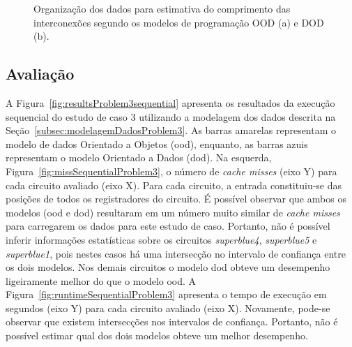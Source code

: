 \begin{figure}[ht]
    \centering
    \hspace{0.1cm}
    \caption[Organização dos dados estudo de caso 3]{Organização dos dados para estimativa do comprimento das interconexões segundo os modelos de programação OOD (a) e DOD (b).}
    \label{fig:problem3ModelagemDados}
\end{figure}


\subsection{Avaliação}

A Figura~\ref{fig:resultsProblem3sequential} apresenta os resultados da execução sequencial do estudo de caso 3 utilizando a modelagem dos dados descrita na Seção~\ref{subsec:modelagemDadosProblem3}. 
As barras amarelas representam o modelo de dados Orientado a Objetos (\ac{ood}), enquanto, as barras azuis representam o modelo Orientado a Dados (\ac{dod}).
Na esquerda, Figura~\ref{fig:missSequentialProblem3}, o número de  \textit{cache misses} (eixo Y) para cada circuito avaliado (eixo X). Para cada circuito, a entrada constituiu-se das posições de todos os registradores do circuito.
É possível observar que ambos os modelos (\ac{ood} e \ac{dod}) resultaram em um número muito similar de \textit{cache misses} para carregarem os dados para este estudo de caso.
Portanto, não é possível inferir informações estatísticas sobre os circuitos \textit{superblue4}, \textit{superblue5} e \textit{superblue1}, pois nestes casos há uma intersecção no intervalo de confiança entre os dois modelos. Nos demais circuitos o modelo \ac{dod} obteve um desempenho ligeiramente melhor do que o modelo \ac{ood}.
A Figura~\ref{fig:runtimeSequentialProblem3} apresenta o tempo de execução em segundos (eixo Y) para cada circuito avaliado (eixo X).
Novamente, pode-se observar que existem intersecções nos intervalos de confiança.
Portanto, não é possível estimar qual dos dois modelos obteve um melhor desempenho.

